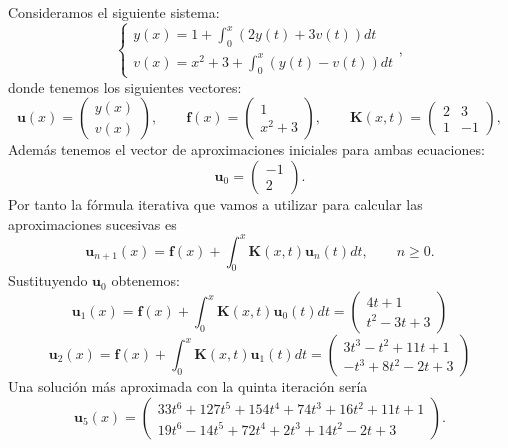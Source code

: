 \begin{ejemplo}
	Consideramos el siguiente sistema:
	\begin{equation}
		\left\lbrace\begin{array}{c}y(x) = 1 + \displaystyle \int_0^x (2y(t)+3v(t))dt \\ v(x) = x^2+3+ \displaystyle \int_0^x (y(t)-v(t))dt \end{array}\right.,
	\end{equation}
	donde tenemos los siguientes vectores:
	\begin{equation}
		\textbf{u}(x) = \begin{pmatrix}	y(x) \\ v(x)	\end{pmatrix}, \qquad \textbf{f}(x) = \begin{pmatrix}	1 \\ x^2+3	\end{pmatrix}, \qquad \textbf{K}(x,t) = \begin{pmatrix}	2 & 3 \\ 1 & -1	\end{pmatrix},
	\end{equation}
	Además tenemos el vector de aproximaciones iniciales para ambas ecuaciones:
	\begin{equation}
		\textbf{u}_0 = \begin{pmatrix}	-1 \\ 2	\end{pmatrix}.
	\end{equation}
	Por tanto la fórmula iterativa que vamos a utilizar para calcular las aproximaciones sucesivas es
	\begin{equation}
		\textbf{u}_{n+1}(x) = \textbf{f}(x) + \int_0^x \textbf{K}(x,t)\textbf{u}_n(t)dt, \qquad n \geqslant 0.
	\end{equation}
	Sustituyendo $\textbf{u}_0$ obtenemos:
	\begin{equation}
		\textbf{u}_{1}(x) = \textbf{f}(x) + \int_0^x \textbf{K}(x,t)\textbf{u}_0(t)dt = \begin{pmatrix}	4t+1 \\ t^2-3t+3	\end{pmatrix}
	\end{equation}
	\begin{equation}
		\textbf{u}_{2}(x) = \textbf{f}(x) + \int_0^x \textbf{K}(x,t)\textbf{u}_1(t)dt = \begin{pmatrix}	3t^3-t^2+11t+1 \\ -t^3+8t^2-2t+3	\end{pmatrix}
	\end{equation}
	Una solución más aproximada con la quinta iteración sería
	\begin{equation}
		\textbf{u}_{5}(x) = \begin{pmatrix}	33t^6+127t^5+154t^4+74t^3+16t^2+11t+1 \\ 19t^6-14t^5+72t^4+2t^3+14t^2-2t+3	\end{pmatrix}.
	\end{equation}
\end{ejemplo}


\endinput
